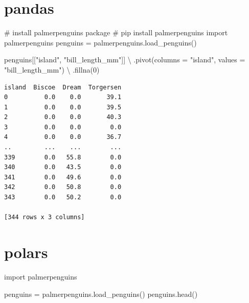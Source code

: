 \documentclass[
  letterpaper,
  DIV=11,
  numbers=noendperiod]{scrreprt}
\newenvironment{Shaded}{\begin{snugshade}}{\end{snugshade}}
\newcommand{\CommentTok}[1]{\textcolor[rgb]{0.37,0.37,0.37}{#1}}
\newcommand{\DecValTok}[1]{\textcolor[rgb]{0.68,0.00,0.00}{#1}}
\newcommand{\ImportTok}[1]{\textcolor[rgb]{0.00,0.46,0.62}{#1}}
\newcommand{\NormalTok}[1]{\textcolor[rgb]{0.00,0.23,0.31}{#1}}
\newcommand{\OperatorTok}[1]{\textcolor[rgb]{0.37,0.37,0.37}{#1}}
\newcommand{\StringTok}[1]{\textcolor[rgb]{0.13,0.47,0.30}{#1}}
\begin{document}
\section{pandas}

\begin{Shaded}
\begin{Highlighting}[]
\CommentTok{\# install palmerpenguins package}
\CommentTok{\# pip install palmerpenguins}
\ImportTok{import}\NormalTok{ palmerpenguins}
\NormalTok{penguins }\OperatorTok{=}\NormalTok{ palmerpenguins.load\_penguins()}
\end{Highlighting}
\end{Shaded}

\begin{Shaded}
\begin{Highlighting}[]
\NormalTok{penguins[[}\StringTok{"island"}\NormalTok{, }\StringTok{"bill\_length\_mm"}\NormalTok{]] }\OperatorTok{\textbackslash{}}
\NormalTok{    .pivot(columns }\OperatorTok{=} \StringTok{"island"}\NormalTok{, values }\OperatorTok{=} \StringTok{"bill\_length\_mm"}\NormalTok{) }\OperatorTok{\textbackslash{}}
\NormalTok{    .fillna(}\DecValTok{0}\NormalTok{)}
\end{Highlighting}
\end{Shaded}

\begin{verbatim}
island  Biscoe  Dream  Torgersen
0          0.0    0.0       39.1
1          0.0    0.0       39.5
2          0.0    0.0       40.3
3          0.0    0.0        0.0
4          0.0    0.0       36.7
..         ...    ...        ...
339        0.0   55.8        0.0
340        0.0   43.5        0.0
341        0.0   49.6        0.0
342        0.0   50.8        0.0
343        0.0   50.2        0.0

[344 rows x 3 columns]
\end{verbatim}

\section{polars}

\begin{Shaded}
\begin{Highlighting}[]
\ImportTok{import}\NormalTok{ palmerpenguins}

\NormalTok{penguins }\OperatorTok{=}\NormalTok{ palmerpenguins.load\_penguins()}
\NormalTok{penguins.head()}
\end{Highlighting}
\end{Shaded}
\end{document}

